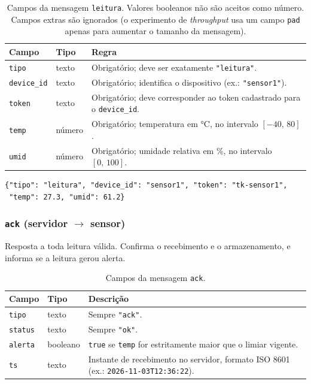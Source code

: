 \documentclass[12pt,a4paper]{article}
\begin{document}
\begin{table}[h]
\centering
\small
\begin{tabular}{@{}llp{7.5cm}@{}}
\toprule
\textbf{Campo} & \textbf{Tipo} & \textbf{Regra} \\
\midrule
\texttt{tipo}      & texto  & Obrigat\'orio; deve ser exatamente \texttt{"leitura"}. \\
\texttt{device\_id}& texto  & Obrigat\'orio; identifica o dispositivo (ex.: \texttt{"sensor1"}). \\
\texttt{token}     & texto  & Obrigat\'orio; deve corresponder ao token cadastrado para o \texttt{device\_id}. \\
\texttt{temp}      & n\'umero & Obrigat\'orio; temperatura em \si{\celsius}, no intervalo $[-40,\,80]$. \\
\texttt{umid}      & n\'umero & Obrigat\'orio; umidade relativa em \%, no intervalo $[0,\,100]$. \\
\bottomrule
\end{tabular}
\caption{Campos da mensagem \texttt{leitura}. Valores booleanos n\~ao s\~ao aceitos como n\'umero. Campos extras s\~ao ignorados (o experimento de \emph{throughput} usa um campo \texttt{pad} apenas para aumentar o tamanho da mensagem).}
\end{table}

\begin{lstlisting}
{"tipo": "leitura", "device_id": "sensor1", "token": "tk-sensor1",
 "temp": 27.3, "umid": 61.2}
\end{lstlisting}

\subsubsection{\texttt{ack} (servidor $\rightarrow$ sensor)}

Resposta a toda leitura v\'alida. Confirma o recebimento e o armazenamento, e
informa se a leitura gerou alerta.

\begin{table}[h]
\centering
\small
\begin{tabular}{@{}llp{7.5cm}@{}}
\toprule
\textbf{Campo} & \textbf{Tipo} & \textbf{Descri\c{c}\~ao} \\
\midrule
\texttt{tipo}   & texto & Sempre \texttt{"ack"}. \\
\texttt{status} & texto & Sempre \texttt{"ok"}. \\
\texttt{alerta} & booleano & \texttt{true} se \texttt{temp} for estritamente maior que o limiar vigente. \\
\texttt{ts}     & texto & Instante de recebimento no servidor, formato ISO 8601 (ex.: \texttt{2026-11-03T12:36:22}). \\
\bottomrule
\end{tabular}
\caption{Campos da mensagem \texttt{ack}.}
\end{table}
\end{document}
